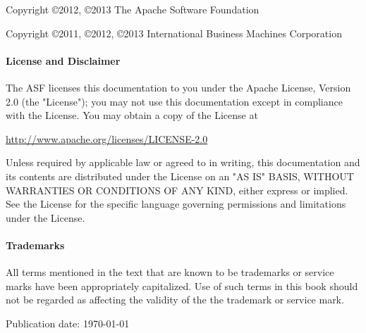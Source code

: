 
%
%
Copyright \copyright 2012, \copyright 2013 The Apache Software Foundation

Copyright \copyright 2011, \copyright 2012, \copyright 2013 International Business Machines Corporation

{\addtolength{\leftskip}{10 mm}
     \paragraph{License and Disclaimer}
     The ASF licenses this documentation to you under the Apache License, Version 2.0 (the "License");
     you may not use this documentation except in compliance with the License.  You may obtain a copy of
     the License at
              
     \url{http://www.apache.org/licenses/LICENSE-2.0}
     
     Unless required by applicable law or agreed to in writing, this documentation and its contents are
     distributed under the License on an "AS IS" BASIS, WITHOUT WARRANTIES OR CONDITIONS OF ANY KIND,
     either express or implied.  See the License for the specific language governing permissions and
     limitations under the License.

     \paragraph{Trademarks}     
     All terms mentioned in the text that are known to be trademarks or service marks have been
     appropriately capitalized.  Use of such terms in this book should not be regarded as affecting the
     validity of the the trademark or service mark.

}

\vspace{.5in}

Publication date: \today
